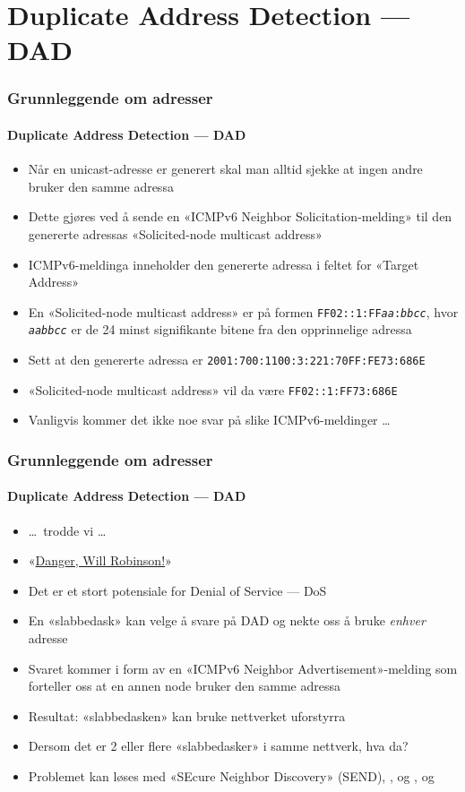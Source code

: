 \section{Duplicate Address Detection --- DAD}
\begin{frame}
  \frametitle{Grunnleggende om adresser}
  \framesubtitle{Duplicate Address Detection --- DAD}
  \begin{itemize}
  \item Når en unicast-adresse er generert skal man alltid sjekke at
    ingen andre bruker den samme adressa\hfill{}
  \item Dette gjøres ved å sende en «ICMPv6 Neighbor
    Solicitation-melding» til den genererte adressas «Solicited-node
    multicast address»
  \item ICMPv6-meldinga inneholder den genererte adressa i feltet for
    «Target Address»\hfill{}
  \item En «Solicited-node multicast address» er på formen
    \texttt{FF02::1:FF\alert{\textit{aa}}:\alert{\textit{bbcc}}},
    hvor \alert{\texttt{\textit{aabbcc}}} er de 24 minst
    signifikante bitene fra den opprinnelige adressa\hfill{}
  \item Sett at den genererte adressa er
    \texttt{2001:700:1100:3:221:70FF:FE\alert{73}:\alert{686E}}
  \item «Solicited-node multicast address» vil da være
    \texttt{FF02::1:FF\alert{73}:\alert{686E}}
  \item Vanligvis kommer det ikke noe svar på slike ICMPv6-meldinger
    \dots
  \end{itemize}
\end{frame}

\begin{frame}
  \frametitle{Grunnleggende om adresser}
  \framesubtitle{Duplicate Address Detection --- DAD}
  \begin{itemize}
  \item \dots\ trodde vi \dots
  \item «\href{http://en.wikipedia.org/wiki/Danger,_Will_Robinson}{Danger, Will Robinson!}»
  \item Det er et stort potensiale for Denial of Service --- DoS\hfill{}
  \item En «slabbedask» kan velge å svare på DAD og nekte oss å bruke
    \textit{enhver\/} adresse
  \item Svaret kommer i form av en «ICMPv6 Neighbor
    Advertisement»-melding som forteller oss at en annen node bruker
    den samme adressa\hfill{}
  \item Resultat: «slabbedasken» kan bruke nettverket uforstyrra
  \item Dersom det er 2 eller flere «slabbedasker» i samme nettverk, hva da?
  \item Problemet kan løses med «SEcure Neighbor Discovery» (SEND),
    , og ,  og 
  \end{itemize}
\end{frame}


